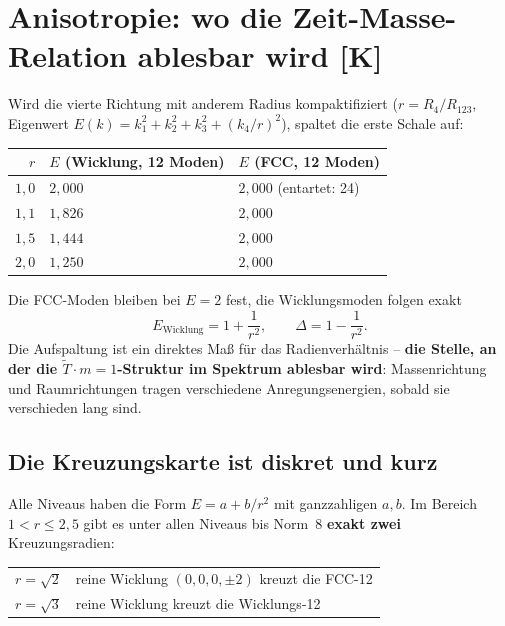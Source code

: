 \documentclass[11pt]{report}
\begin{document}
\chapter{Anisotropie: wo die Zeit-Masse-Relation ablesbar wird [K]}

Wird die vierte Richtung mit anderem Radius kompaktifiziert
($r = R_4/R_{123}$, Eigenwert $E(k) = k_1^2+k_2^2+k_3^2+(k_4/r)^2$),
spaltet die erste Schale auf:

\begin{center}
\begin{tabular}{rll}
\toprule
$r$ & $E$ (Wicklung, 12 Moden) & $E$ (FCC, 12 Moden) \\
\midrule
$1{,}0$ & $2{,}000$ & $2{,}000$ (entartet: 24) \\
$1{,}1$ & $1{,}826$ & $2{,}000$ \\
$1{,}5$ & $1{,}444$ & $2{,}000$ \\
$2{,}0$ & $1{,}250$ & $2{,}000$ \\
\bottomrule
\end{tabular}
\end{center}

Die FCC-Moden bleiben bei $E = 2$ fest, die Wicklungsmoden folgen
exakt
\begin{equation}
  E_\text{Wicklung} = 1 + \frac{1}{r^2},
  \qquad
  \Delta = 1 - \frac{1}{r^2}.
\end{equation}
Die Aufspaltung ist ein direktes Maß für das Radienverhältnis --
\textbf{die Stelle, an der die $\tilde T\cdot m = 1$-Struktur im
Spektrum ablesbar wird}: Massenrichtung und Raumrichtungen tragen
verschiedene Anregungsenergien, sobald sie verschieden lang sind.

\section{Die Kreuzungskarte ist diskret und kurz}

Alle Niveaus haben die Form $E = a + b/r^2$ mit ganzzahligen
$a, b$. Im Bereich $1 < r \le 2{,}5$ gibt es unter allen Niveaus bis
Norm~8 \textbf{exakt zwei} Kreuzungsradien:

\begin{center}
\begin{tabular}{ll}
\toprule
$r = \sqrt{2}$ & reine Wicklung $(0,0,0,\pm2)$ kreuzt die FCC-12 \\
$r = \sqrt{3}$ & reine Wicklung kreuzt die Wicklungs-12 \\
\bottomrule
\end{tabular}
\end{center}
\end{document}
